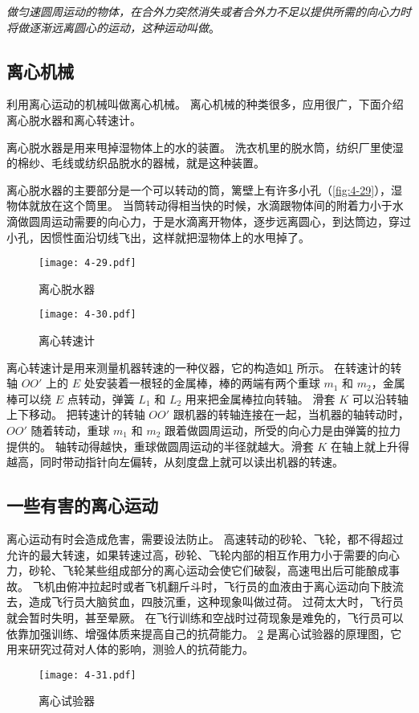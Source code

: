 \emph{做匀速圆周运动的物体，在合外力突然消失或者合外力不足以提供所需的向心力时将做逐渐远离圆心的运动，这种运动叫做}。

\subsection{离心机械}

利用离心运动的机械叫做离心机械。
离心机械的种类很多，应用很广，下面介绍离心脱水器和离心转速计。

离心脱水器是用来甩掉湿物体上的水的装置。
洗衣机里的脱水筒，纺织厂里使湿的棉纱、毛线或纺织品脱水的器械，就是这种装置。

离心脱水器的主要部分是一个可以转动的筒，篱壁上有许多小孔（\cref{fig:4-29}），湿物体就放在这个筒里。
当筒转动得相当快的时候，水滴跟物体间的附着力小于水滴做圆周运动需要的向心力，于是水滴离开物体，逐步远离圆心，到达筒边，穿过小孔，因惯性面沿切线飞出，这样就把湿物体上的水甩掉了。

\begin{figure}
	\begin{minipage}[b]{0.48\linewidth}
		\centering
    \texttt{[image: 4-29.pdf]}
    \caption{离心脱水器}\label{fig:4-29}
	\end{minipage}
	\begin{minipage}[b]{0.48\linewidth}\centering
    \texttt{[image: 4-30.pdf]}
    \caption{离心转速计}\label{fig:4-30}
	\end{minipage}
\end{figure}

离心转速计是用来测量机器转速的一种仪器，它的构造如\cref{fig:4-30} 所示。
在转速计的转轴 $OO'$ 上的 $E$ 处安装着一根轻的金属棒，棒的两端有两个重球 $m_1$ 和 $m_2$，金属棒可以绕 $E$ 点转动，弹簧 $L_1$ 和 $L_2$ 用来把金属棒拉向转轴。
滑套 $K$ 可以沿转轴上下移动。
把转速计的转轴 $OO'$ 跟机器的转轴连接在一起，当机器的轴转动时，$OO'$ 随着转动，重球 $m_1$ 和 $m_2$ 跟着做圆周运动，所受的向心力是由弹簧的拉力提供的。
轴转动得越快，重球做圆周运动的半径就越大。滑套 $K$ 在轴上就上升得越高，同时带动指针向左偏转，从刻度盘上就可以读出机器的转速。

\subsection{一些有害的离心运动} 

离心运动有时会造成危害，需要设法防止。
高速转动的砂轮、飞轮，都不得超过允许的最大转速，如果转速过高，砂轮、飞轮内部的相互作用力小于需要的向心力，砂轮、飞轮某些组成部分的离心运动会使它们破裂，高速甩出后可能酿成事故。
飞机由俯冲拉起时或者飞机翻斤斗时，飞行员的血液由于离心运动向下肢流去，造成飞行员大脑贫血，四肢沉重，这种现象叫做过荷。
过荷太大时，飞行员就会暂时失明，甚至晕厥。
在飞行训练和空战时过荷现象是难免的，飞行员可以依靠加强训练、增强体质来提高自己的抗荷能力。
\cref{fig:4-31} 是离心试验器的原理图，它用来研究过荷对人体的影响，测验人的抗荷能力。
\begin{figure}
  \texttt{[image: 4-31.pdf]}
  \caption{离心试验器}\label{fig:4-31}
\end{figure}

